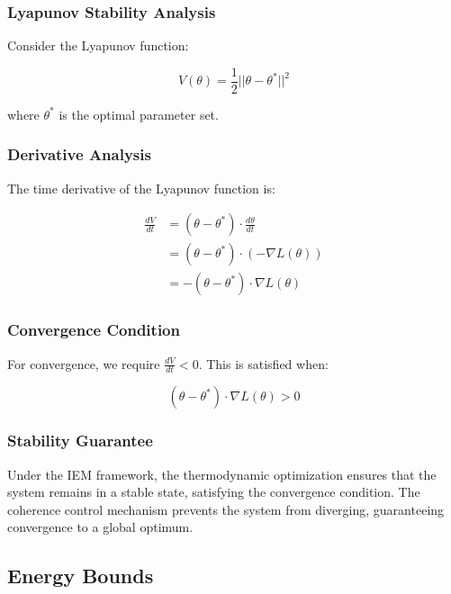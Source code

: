 \documentclass[12pt]{article}
\begin{document}
\subsubsection{Lyapunov Stability Analysis}

Consider the Lyapunov function:

\begin{equation}
V(\theta) = \frac{1}{2}||\theta - \theta^*||^2
\end{equation}

where $\theta^*$ is the optimal parameter set.

\subsubsection{Derivative Analysis}

The time derivative of the Lyapunov function is:

\begin{align}
\frac{dV}{dt} &= (\theta - \theta^*) \cdot \frac{d\theta}{dt} \\
&= (\theta - \theta^*) \cdot (-\nabla L(\theta)) \\
&= -(\theta - \theta^*) \cdot \nabla L(\theta)
\end{align}

\subsubsection{Convergence Condition}

For convergence, we require $\frac{dV}{dt} < 0$. This is satisfied when:

\begin{equation}
(\theta - \theta^*) \cdot \nabla L(\theta) > 0
\end{equation}

\subsubsection{Stability Guarantee}

Under the IEM framework, the thermodynamic optimization ensures that the system remains in a stable state, satisfying the convergence condition. The coherence control mechanism prevents the system from diverging, guaranteeing convergence to a global optimum.

\subsection{Energy Bounds}
\end{document}
